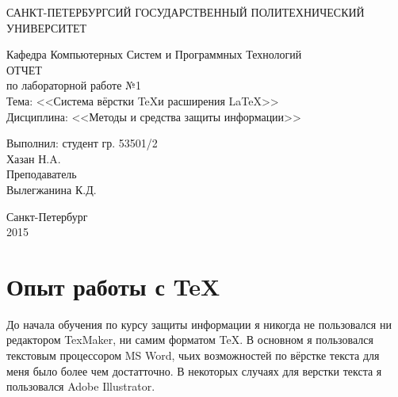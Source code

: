 \documentclass[utf8x, 12pt]{G7-32}
\begin{document}
\frontmatter 


\begin{center} 

\large САНКТ-ПЕТЕРБУРГСИЙ ГОСУДАРСТВЕННЫЙ ПОЛИТЕХНИЧЕСКИЙ УНИВЕРСИТЕТ

\large Кафедра Компьютерных Систем и Программных Технологий \\[5.5cm] 

\huge ОТЧЕТ \\[0.6cm] %
\large по лабораторной работе №1\\
\large Тема: <<Система вёрстки \TeX и расширения \LaTeX>>\\
\large Дисциплина: <<Методы и средства защиты информации>>\\[3.7cm]

\end{center} 

\begin{flushright}
Выполнил: студент гр. 53501/2 \\
Хазан Н.A. \\[1.2cm]


Преподаватель \\
Вылегжанина К.Д.
\end{flushright}


\vfill 

\begin{center} 
\large Санкт-Петербург \\
2015
\end{center} 

\thispagestyle{empty}



\thispagestyle{empty}
\setcounter{page}{0}
\tableofcontents
\clearpage
\mainmatter



\chapter{Опыт работы с \TeX}

До начала обучения по курсу защиты информации я никогда не пользовался ни редактором TexMaker, ни самим форматом \TeX . В основном я пользовался текстовым процессором MS Word, чьих возможностей по вёрстке текста для меня было более чем достатточно. \hfil\break
В некоторых случаях для верстки текста я пользовался Adobe Illustrator.
\end{document}
